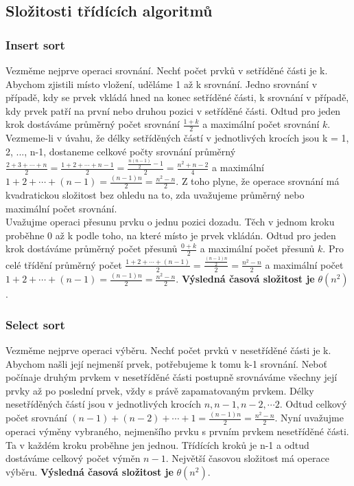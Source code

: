 \documentclass[10pt,a4paper]{article}
\begin{document}
\subsection{Složitosti třídících algoritmů}
\subsubsection{Insert sort}
Vezměme nejprve operaci srovnání. Nechť počet prvků v setříděné části je k. Abychom zjistili místo vložení, uděláme 1 až k srovnání. Jedno srovnání v případě, kdy se prvek vkládá hned na konec setříděné části, k srovnání v případě, kdy prvek patří na první nebo druhou pozici v setříděné části. Odtud pro jeden krok dostáváme průměrný počet srovnání $\frac{1+k}{2}$ a maximální počet srovnání $k$. Vezmeme-li v úvahu, že délky setříděných částí v jednotlivých krocích jsou k = 1, 2, ..., n-1, dostaneme celkové počty srovnání průměrný $\frac{2+3+\cdots+n}{2} = \frac{1+2+\cdots+n-1}{2} = \frac{\frac{n(n-1)}{2}-1}{2} = \frac{n^2+n-2}{4}$ a maximální $1+2+\cdots+(n-1) = \frac{(n-1)n}{2} = \frac{n^2-n}{2}$. Z toho plyne, že operace srovnání má kvadratickou složitost bez ohledu na to, zda uvažujeme průměrný nebo maximální počet srovnání. \\
Uvažujme operaci přesunu prvku o jednu pozici dozadu. Těch v jednom kroku proběhne 0 až k podle toho, na které místo je prvek vkládán. Odtud pro jeden krok dostáváme průměrný počet přesunů $\frac{0+k}{2}$ a maximální počet přesunů $k$. Pro celé třídění průměrný počet $\frac{1+2+\cdots+(n-1)}{2} = \frac{\frac{(n-1)n}{2}}{2} = \frac{n^2-n}{2}$ a maximální počet $1+2+\cdots+(n-1) = \frac{(n-1)n}{2} = \frac{n^2-n}{2}$. \textbf{Výsledná časová složitost je} $\theta (n^2)$.

\subsubsection{Select sort}
Vezměme nejprve operaci výběru. Nechť počet prvků v nesetříděné části je k. Abychom našli její nejmenší prvek, potřebujeme k tomu k-1 srovnání. Neboť počínaje druhým prvkem v nesetříděné části postupně srovnáváme všechny její prvky až po poslední prvek, vždy s právě zapamatovaným prvkem. Délky nesetříděných částí jsou v jednotlivých krocích $n, n-1, n-2, \cdots 2$. Odtud celkový počet srovnání $(n-1) + (n-2) + \cdots + 1 = \frac{(n-1)n}{2} = \frac{n^2-n}{2}$. Nyní uvažujme operaci výměny vybraného, nejmenšího prvku s prvním prvkem nesetříděné části. Ta v každém kroku proběhne jen jednou. Třídících kroků je n-1 a odtud dostáváme celkový počet výměn $n-1$. Největší časovou složitost má operace výběru. \textbf{Výsledná časová složitost je} $\theta (n^2)$.
\end{document}
